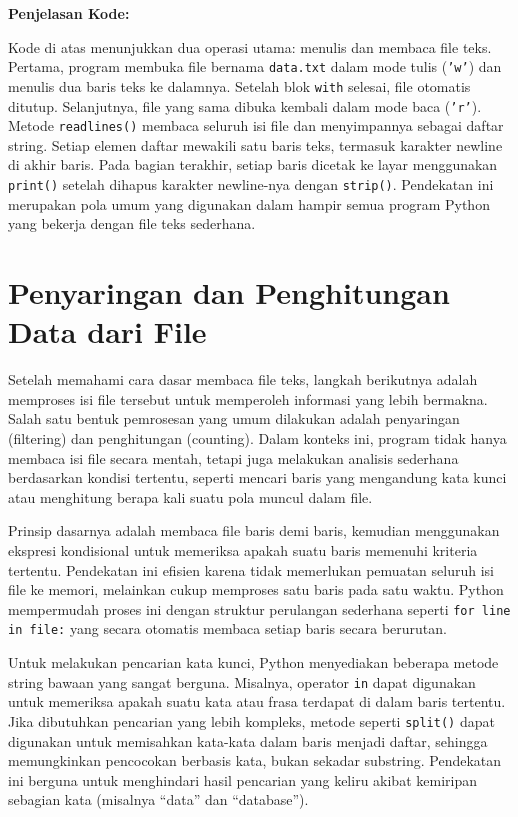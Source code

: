 \noindent\textbf{Penjelasan Kode:}

Kode di atas menunjukkan dua operasi utama: menulis dan membaca file teks. Pertama, program membuka file bernama \texttt{data.txt} dalam mode tulis (\texttt{'w'}) dan menulis dua baris teks ke dalamnya. Setelah blok \texttt{with} selesai, file otomatis ditutup. Selanjutnya, file yang sama dibuka kembali dalam mode baca (\texttt{'r'}). Metode \texttt{readlines()} membaca seluruh isi file dan menyimpannya sebagai daftar string. Setiap elemen daftar mewakili satu baris teks, termasuk karakter newline di akhir baris. Pada bagian terakhir, setiap baris dicetak ke layar menggunakan \texttt{print()} setelah dihapus karakter newline-nya dengan \texttt{strip()}. Pendekatan ini merupakan pola umum yang digunakan dalam hampir semua program Python yang bekerja dengan file teks sederhana.


\section{Penyaringan dan Penghitungan Data dari File}

Setelah memahami cara dasar membaca file teks, langkah berikutnya adalah memproses isi file tersebut untuk memperoleh informasi yang lebih bermakna. Salah satu bentuk pemrosesan yang umum dilakukan adalah penyaringan (filtering) dan penghitungan (counting). Dalam konteks ini, program tidak hanya membaca isi file secara mentah, tetapi juga melakukan analisis sederhana berdasarkan kondisi tertentu, seperti mencari baris yang mengandung kata kunci atau menghitung berapa kali suatu pola muncul dalam file.

Prinsip dasarnya adalah membaca file baris demi baris, kemudian menggunakan ekspresi kondisional untuk memeriksa apakah suatu baris memenuhi kriteria tertentu. Pendekatan ini efisien karena tidak memerlukan pemuatan seluruh isi file ke memori, melainkan cukup memproses satu baris pada satu waktu. Python mempermudah proses ini dengan struktur perulangan sederhana seperti \texttt{for line in file:} yang secara otomatis membaca setiap baris secara berurutan.

Untuk melakukan pencarian kata kunci, Python menyediakan beberapa metode string bawaan yang sangat berguna. Misalnya, operator \texttt{in} dapat digunakan untuk memeriksa apakah suatu kata atau frasa terdapat di dalam baris tertentu. Jika dibutuhkan pencarian yang lebih kompleks, metode seperti \texttt{split()} dapat digunakan untuk memisahkan kata-kata dalam baris menjadi daftar, sehingga memungkinkan pencocokan berbasis kata, bukan sekadar substring. Pendekatan ini berguna untuk menghindari hasil pencarian yang keliru akibat kemiripan sebagian kata (misalnya “data” dan “database”).

